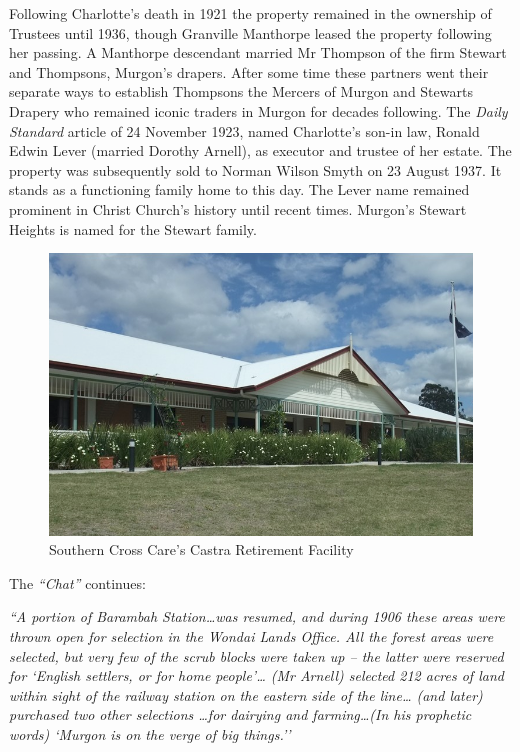 Following Charlotte's death in 1921 the property remained in the ownership of Trustees until 1936, though Granville Manthorpe leased the property following her passing. A Manthorpe descendant married Mr Thompson of the firm Stewart and Thompsons, Murgon's drapers. After some time these partners went their separate ways to establish Thompsons the Mercers of Murgon and Stewarts Drapery who remained iconic traders in Murgon for decades following. The \emph{Daily Standard} article of 24 November 1923, named Charlotte's son-in law, Ronald Edwin Lever (married Dorothy Arnell), as executor and trustee of her estate. The property was subsequently sold to Norman Wilson Smyth on 23 August 1937. It stands as a functioning family home to this day. The Lever name remained prominent in Christ Church's history until recent times. Murgon's Stewart Heights is named for the Stewart family.









\begin{figure}
\begin{center}
\includegraphics[width=1.\linewidth,center]{../images/castraToday.png}
\caption{ Southern Cross Care's Castra Retirement Facility}
\end{center}
\end{figure}




The \emph{``Chat''} continues:



\emph{``A portion of Barambah Station\ldots was resumed, and during 1906 these areas were thrown open for selection in the Wondai Lands Office. All the forest areas were selected, but very few of the scrub blocks were taken up -- the latter were reserved for `English settlers, or for home people'\ldots{} (Mr Arnell) selected 212 acres of land within sight of the railway station on the eastern side of the line\ldots{} (and later) purchased two other selections \ldots for dairying and farming\ldots(In his prophetic words) `Murgon is on the verge of big things.''}



